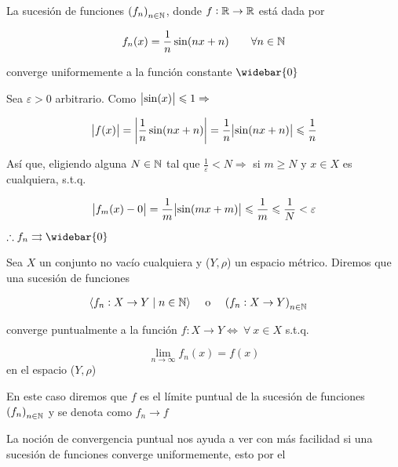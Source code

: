 \begin{eg}
    La sucesión de funciones $ {\left(f_n \right)}_{n \in \mathbb{N}}$, donde $f : \mathbb{R} \to \mathbb{R}$ está dada por 

    $$f_n(x) = \frac{1}{n} \sin (nx+n) \: \: \: \: \:\:\:\:\: \forall n \in \mathbb{N}$$

    converge uniformemente a la función constante $\widebar{0}$
\end{eg}

\begin{proofexplanation}
     Sea $\varepsilon > 0$ arbitrario. Como $\abs{\sin(x)} \leqslant 1 \Rightarrow$

     $$\abs{f(x)} = \abs{\frac{1}{n} \sin (nx+n)}  = \frac{1}{n} \abs{\sin (nx+n)} \leqslant \frac{1}{n} $$

     Así que, eligiendo alguna $N \in \mathbb{N}$ tal que $\frac{1}{\varepsilon} < N \Rightarrow$ si $m \geqslant N$ y $x \in X$ es cualquiera, s.t.q.

     $$\abs{f_m(x)-0} = \frac{1}{m} \abs{\sin (mx+m)} \leqslant \frac{1}{m} \leqslant \frac{1}{N} < \varepsilon$$

     $\therefore f_n \rightrightarrows \widebar{0}$
\end{proofexplanation}

\begin{definition} \label{defcp1}
    Sea $X$ un conjunto no vacío cualquiera y ($Y,\rho$) un espacio métrico. Diremos que una sucesión de funciones 

    \begin{align*}
      \langle f_n : X \to Y \mid n \in \mathbb{N} \rangle  && \text{ o } && {\left(f_n : X \to Y \right)}_{n \in \mathbb{N}}&& 
    \end{align*}

    converge puntualmente a la función $f : X \to Y \iff \: \forall \: x \in X$ s.t.q.

    $$\lim_{n \to \infty} f_n(x) = f(x)$$
    en el espacio ($Y,\rho$)
\end{definition}

\begin{notation}
    En este caso diremos que $f$ es el límite puntual de la sucesión de funciones ${\left(f_n \right)}_{n \in \mathbb{N}}$ y se denota como $f_n \rightarrow f$
\end{notation}

\begin{remark}
    La noción de convergencia puntual nos ayuda a ver con más facilidad si una sucesión de funciones converge uniformemente, esto por el  
\end{remark}

